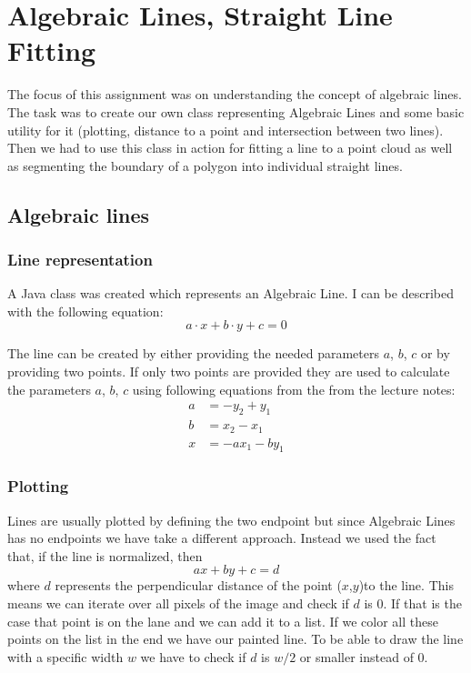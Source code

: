 \chapter{Algebraic Lines, Straight Line Fitting}

The focus of this assignment was on understanding the concept of algebraic lines. The task was to create our own class representing Algebraic Lines and some basic utility for it (plotting, distance to a point and intersection between two lines). Then we had to use this class in action for fitting a line to a point cloud as well as segmenting the boundary of a polygon into individual straight lines.

\section{Algebraic lines}

\subsection{Line representation}
A Java class was created which represents an Algebraic Line. I can be described with the following equation:
\begin{equation}
\label{equ:algLineEquation}
	a \cdot x + b \cdot y + c = 0
\end{equation}

The line can be created by either providing the needed parameters $a$, $b$, $c$ or by providing two points. If only two points are provided they are used to calculate the parameters $a$, $b$, $c$ using following equations from the from the lecture notes:
\begin{align}
	a& = -y_2 + y_1 \\
	b& = x_2 - x_1 \\
	x& = -ax_1 - by_1 
\end{align}

\subsection{Plotting}
Lines are usually plotted by defining the two endpoint but since Algebraic Lines has no endpoints we have take a different approach. Instead we used the fact that, if the line is normalized, then 
\begin{equation}
\label{equ:lineEquation}
	ax + by + c = d
\end{equation}
where $d$ represents the perpendicular distance of the point ($x$,$y$)to the line. This means we can iterate over all pixels of the image and check if $d$ is 0. If that is the case that point is on the lane and we can add it to a list. If we color all these points on the list in the end we have our painted line. To be able to draw the line with a specific width $w$ we have to check if $d$ is $w/2$ or smaller instead of $0$.

